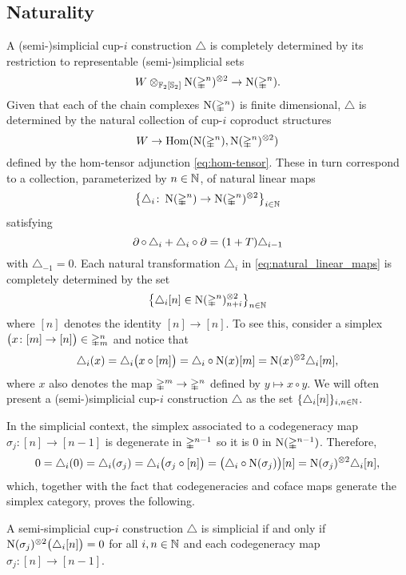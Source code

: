 \subsection{Naturality}\label{ss:naturality}

A (semi-)simplicial \mbox{cup-$i$} construction $\triangle$ is completely determined by its restriction to representable (semi-)simplicial sets
\[
W \ot_{\Ftwo[\Sym_2]} \chains(\simplex^n)^{\ot 2} \to \chains(\simplex^n).
\]
Given that each of the chain complexes $\chains(\simplex^n)$ is finite dimensional, $\triangle$ is determined by the natural collection of cup-$i$ coproduct structures
\[
W \to \Hom(\chains(\simplex^n), \chains(\simplex^n)^{\ot 2})
\]
defined by the hom-tensor adjunction \eqref{eq:hom-tensor}.
These in turn correspond to a collection, parameterized by $n \in \N$, of natural linear maps
\begin{equation}\label{eq:natural_linear_maps}
	\set[\big]{\triangle_i \colon \chains(\simplex^n) \to \chains(\simplex^n)^{\ot 2}}_{i \in \N}
\end{equation}
satisfying
\[
\bd \circ \, \triangle_i + \triangle_i \circ \bd =
(1+T) \triangle_{i-1}
\]
with $\triangle_{-1} = 0$.
Each natural transformation $\triangle_i$ in \eqref{eq:natural_linear_maps} is completely determined by the set
\[
\set[\big]{\triangle_i[n] \in \chains(\simplex^n)^{\ot 2}_{n+i}}_{n\in\N}
\]
where $[n]$ denotes the identity $[n] \to [n]$.
To see this, consider a simplex $\big(x \colon [m] \to [n] \big) \in \simplex^n_m$ and notice that
\[
\triangle_i(x) = \triangle_i \big( x \circ [m] \big) =
\triangle_i \circ \chains(x) [m] =
\chains(x)^{\ot 2} \triangle_i[m],
\]
where $x$ also denotes the map $\simplex^m \to \simplex^n$ defined by $y \mapsto x \circ y$.
We will often present a (semi-)simplicial \mbox{cup-$i$} construction $\triangle$ as the set $\set{\triangle_i[n]}_{i,n\in\N}$.

In the simplicial context, the simplex associated to a codegeneracy map $\sigma_j \colon [n] \to [n-1]$ is degenerate in $\simplex^{n-1}$ so it is $0$ in $\chains(\simplex^{n-1})$.
Therefore,
\[
0 = \triangle_i(0) = \triangle_i(\sigma_j) =
\triangle_i \big( \sigma_j \circ [n] \big) =
\big( \triangle_i \circ \chains(\sigma_j) \big) [n] =
\chains(\sigma_j)^{\ot 2} \triangle_i[n],
\]
which, together with the fact that codegeneracies and coface maps generate the simplex category, proves the following.

\begin{lemma}\label{l:simplicial_from_semisimplicial}
	A semi-simplicial \mbox{cup-$i$} construction $\triangle$ is simplicial if and only if $\chains(\sigma_j)^{\ot 2}\big(\triangle_i[n]\big) = 0$ for all $i,n\in\N$ and each codegeneracy map $\sigma_j \colon [n] \to [n-1]$.
\end{lemma}

